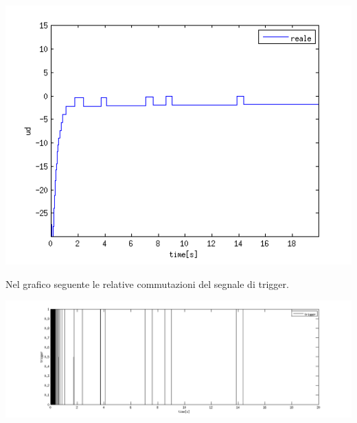 \documentclass[a4paper,13pt]{article}
\begin{document}
\begin{center}
\includegraphics[scale=0.6]{graph/udiscsin.png}
\end{center}
	Nel grafico seguente le relative commutazioni del segnale di trigger.
\begin{center}
\includegraphics[scale=0.4]{graph/trigger2.png}
\end{center}
\end{document}
